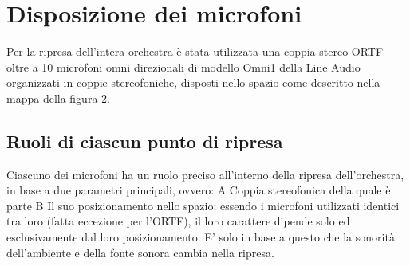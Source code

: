 \newcommand{\mylanguages}{italian} %
\newcommand{\mytitle}{Totalità sonora: il corpo dell'orchestra}
\newcommand{\mysubtitle}{Per ascoltare l'organismo sonoro orchestrale nel suo complesso e nei singoli dettagli\\ da lontano e da vicino}
\newcommand{\authorone}{Giancarlo Bottalico}
\newcommand{\institutione}{Conservatorio di musica "N. Piccinni", Bari}
\newcommand{\emailone}{giancarlobottalico@gmail.com}


\maketitle
\thispagestyle{empty}
\section*{Disposizione dei microfoni}
Per la ripresa dell'intera orchestra è stata utilizzata una coppia stereo ORTF oltre a  10 microfoni omni direzionali di modello Omni1 della Line Audio organizzati in coppie stereofoniche, disposti nello spazio come descritto nella mappa della figura 2.

\subsection*{Ruoli di ciascun punto di ripresa}
Ciascuno dei microfoni ha un ruolo preciso all'interno della ripresa dell'orchestra, in base a due parametri principali, ovvero:
A Coppia stereofonica della quale è parte
B Il suo posizionamento nello spazio: essendo i microfoni utilizzati identici tra loro (fatta eccezione per l'ORTF), il loro carattere dipende solo ed esclusivamente dal loro posizionamento. E' solo in base a questo che la sonorità dell'ambiente e della fonte sonora cambia nella ripresa.

